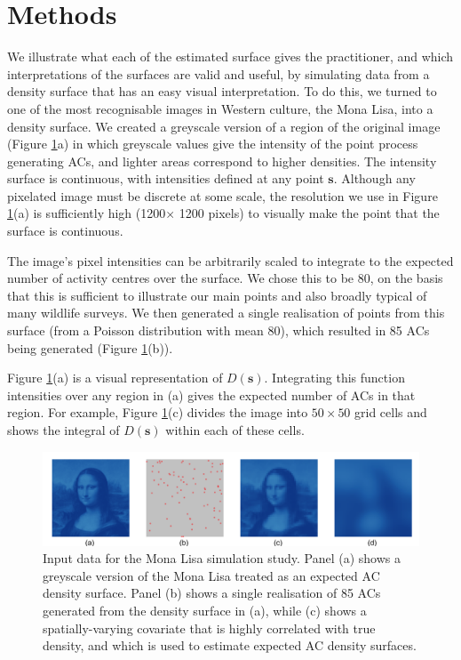 \documentclass[useAMS,usenatbib,referee]{biom}
\begin{document}
\section{Methods}

We illustrate what each of the estimated surface gives the practitioner, and which interpretations of the surfaces are valid and useful, by simulating data from a density surface that has an easy visual interpretation. To do this, we turned to one of the most recognisable images in Western culture, the Mona Lisa, into a density surface. We created a greyscale version of a region of the original image (Figure \ref{mlinputs}a) in which greyscale values give the intensity of the point process generating ACs, and lighter areas correspond to higher densities. The intensity surface is continuous, with intensities defined at any point $\bm{s}$. Although any pixelated image must be discrete at some scale, the resolution we use in Figure \ref{mlinputs}(a) is sufficiently high (1200$\times$ 1200 pixels) to visually make the point that the surface is continuous.  

The image's pixel intensities can be arbitrarily scaled to integrate to the expected number of activity centres over the surface. We chose this to be 80, on the basis that this is sufficient to illustrate our main points and also broadly typical of many wildlife surveys. We then generated a single realisation of points from this surface (from a Poisson distribution with mean 80), which resulted in 85 ACs being generated (Figure \ref{mlinputs}(b)).

Figure \ref{mlinputs}(a) is a visual representation of $D(\bm{s})$. Integrating this function intensities over any region in (a) gives the expected number of ACs in that region. For example, Figure \ref{mlinputs}(c) divides the image into 
$50 \times 50$ grid cells and shows the integral of $D(\bm{s})$ within each of these cells. 

\begin{figure}[htbp]
\centering
\includegraphics[width=1\textwidth]{mona_inputdata.png}
\caption{Input data for the Mona Lisa simulation study. Panel (a) shows a greyscale version of the Mona Lisa treated as an expected AC density surface. Panel (b) shows a single realisation of 85 ACs generated from the density surface in (a), while (c) shows a spatially-varying covariate that is highly correlated with true density, and which is used to estimate expected AC density surfaces.}
\label{mlinputs}
\end{figure}
\end{document}
